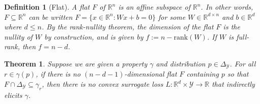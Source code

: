 \documentclass{article}
\newcommand{\reals}{\mathbb{R}}
\newcommand{\simplex}{\Delta_\Y}
\newcommand{\Y}{\mathcal{Y}}
\newtheorem{theorem}{Theorem}
\newtheorem{definition}{Definition}
\begin{document}
\begin{definition}[Flat]
	A \emph{flat} $F$ of $\reals^n$ is an affine subspace of $\reals^n$.
	In other words, $F\subseteq \reals^n$ can be written $F=\{x\in\reals^n : Wx + b = 0\}$ for some $W\in\reals^{d\times n}$ and $b\in\reals^d$ where $d\leq n$.
	By the rank-nullity theorem, the dimension of the flat $F$ is the nullity of $W$ by construction, and is given by $f := n - \mathrm{rank}(W)$.
	If $W$ is full-rank, then $f = n - d$.
\end{definition}

\begin{theorem}\label{thm:cvx-flats}
	Suppose we are given a property $\gamma$ and distribution $p \in \simplex$.
	For all $r\in\gamma(p)$, if there is no $(n - d-1)$-dimensional flat $F$ containing $p$ so that $F \cap \simplex \subseteq \gamma_r$, then there is no convex surrogate loss $L : \reals^d \times \Y \to \reals$ that indirectly elicits $\gamma$.
\end{theorem}
\end{document}
